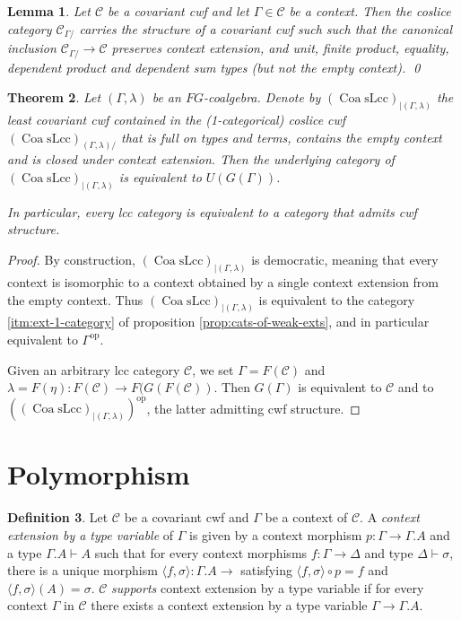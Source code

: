 \documentclass[a4paper]{article}
\newtheorem{theorem}{Theorem}
\newtheorem{lemma}[theorem]{Lemma}
\theoremstyle{remark}
\theoremstyle{definition}
\newtheorem{definition}[theorem]{Definition}
\begin{document}
\begin{lemma}
  Let $\mathcal{C}$ be a covariant cwf and let $\Gamma \in \mathcal{C}$ be a context.
  Then the coslice category $\mathcal{C}_{\Gamma /}$ carries the structure of a covariant cwf such such that the canonical inclusion $\mathcal{C}_{\Gamma /} \rightarrow \mathcal{C}$ preserves context extension, and unit, finite product, equality, dependent product and dependent sum types (but not the empty context).
  \qed
\end{lemma}

\begin{theorem}
  \label{th:context-as-model}
  Let $(\Gamma, \lambda)$ be an $FG$-coalgebra.
  Denote by $(\operatorname{Coa} \mathrm{sLcc})_{| (\Gamma, \lambda)}$ the least covariant cwf contained in the (1-categorical) coslice cwf $(\operatorname{Coa} \mathrm{sLcc})_{(\Gamma, \lambda) /}$ that is full on types and terms, contains the empty context and is closed under context extension.
  Then the underlying category of $(\operatorname{Coa} \mathrm{sLcc})_{| (\Gamma, \lambda)}$ is equivalent to $U(G(\Gamma))$.

  In particular, every lcc category is equivalent to a category that admits cwf structure.
\end{theorem}
\begin{proof}
  By construction, $(\operatorname{Coa} \mathrm{sLcc})_{| (\Gamma, \lambda)}$ is democratic, meaning that every context is isomorphic to a context obtained by a single context extension from the empty context.
  Thus $(\operatorname{Coa} \mathrm{sLcc})_{| (\Gamma, \lambda)}$ is equivalent to the category \ref{itm:ext-1-category} of proposition \ref{prop:cats-of-weak-exts}, and in particular equivalent to $\Gamma^\mathrm{op}$.

  Given an arbitrary lcc category $\mathcal{C}$, we set $\Gamma = F(\mathcal{C})$ and $\lambda = F(\eta) : F(\mathcal{C}) \rightarrow F(G(F(\mathcal{C}))$.
  Then $G(\Gamma)$ is equivalent to $\mathcal{C}$ and to $((\operatorname{Coa} \mathrm{sLcc})_{| (\Gamma, \lambda)})^\mathrm{op}$, the latter admitting cwf structure.
\end{proof}

\section{Polymorphism}

\begin{definition}
  \label{def:type-ext}
  Let $\mathcal{C}$ be a covariant cwf and $\Gamma$ be a context of $\mathcal{C}$.
  A \emph{context extension by a type variable} of $\Gamma$ is given by a context morphism $p : \Gamma \rightarrow \Gamma.A$ and a type $\Gamma.A \vdash A$ such that for every context morphisms $f : \Gamma \rightarrow \Delta$ and type $\Delta \vdash \sigma$, there is a unique morphism $\langle f, \sigma \rangle : \Gamma.A \rightarrow$ satisfying $\langle f, \sigma \rangle \circ p = f$ and $\langle f, \sigma \rangle(A) = \sigma$.
  $\mathcal{C}$ \emph{supports} context extension by a type variable if for every context $\Gamma$ in $\mathcal{C}$ there exists a context extension by a type variable $\Gamma \rightarrow \Gamma.A$.
\end{definition}
\end{document}
